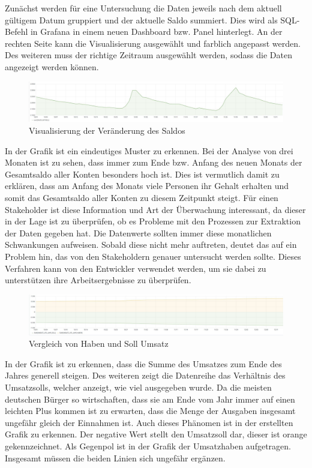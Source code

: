 Zunächst werden für eine Untersuchung die Daten jeweils nach dem aktuell gültigem Datum gruppiert und der aktuelle Saldo summiert.
Dies wird als SQL-Befehl in Grafana in einem neuen Dashboard bzw. Panel hinterlegt.
An der rechten Seite kann die Visualisierung ausgewählt und farblich angepasst werden.
Des weiteren muss der richtige Zeitraum ausgewählt werden, sodass die Daten angezeigt werden können.

\begin{figure}[h]
\centering
\includegraphics[width=150mm,scale=1]{content/Saldo_aktuell.jpg}
\caption{Visualisierung der Veränderung des Saldos}%
\end{figure}


In der Grafik ist ein eindeutiges Muster zu erkennen. 
Bei der Analyse von drei Monaten ist zu sehen, dass immer zum Ende bzw. Anfang des neuen Monats der Gesamtsaldo aller Konten besonders hoch ist. 
Dies ist vermutlich damit zu erklären, dass am Anfang des Monats viele Personen ihr Gehalt erhalten und somit das Gesamtsaldo aller Konten zu diesem Zeitpunkt steigt. 
Für einen Stakeholder ist diese Information und Art der Überwachung interessant, da dieser in der Lage ist zu überprüfen, ob es Probleme mit den Prozessen zur Extraktion der Daten gegeben hat. 
Die Datenwerte sollten immer diese monatlichen Schwankungen aufweisen.
Sobald diese nicht mehr auftreten, deutet das auf ein Problem hin, das von den Stakeholdern genauer untersucht werden sollte. 
Dieses Verfahren kann von den Entwickler verwendet werden, um sie dabei zu unterstützen ihre Arbeitsergebnisse zu überprüfen.



\begin{figure}[h]
\centering
\includegraphics[width=150mm,scale=1]{content/vergleich_haben_soll.jpg}
\caption{Vergleich von Haben und Soll Umsatz}%
\end{figure}

In der Grafik ist zu erkennen, dass die Summe des Umsatzes zum Ende des Jahres generell steigen. 
Des weiteren zeigt die Datenreihe das Verhältnis des Umsatzsolls, welcher anzeigt, wie viel ausgegeben wurde. 
Da die meisten deutschen Bürger so wirtschaften, dass sie am Ende vom Jahr immer auf einen leichten Plus kommen ist zu erwarten, dass die Menge der Ausgaben insgesamt ungefähr gleich der Einnahmen ist. \cite{https://www.welt.de/wirtschaft/article189283761/Sparverhalten-der-Deutschen-Fast-jeder-Dritte-hat-am-Monatsende-kein-Geld-mehr.html}
Auch dieses Phänomen ist in der erstellten Grafik zu erkennen. 
Der negative Wert stellt den Umsatzsoll dar, dieser ist orange gekennzeichnet. 
Als Gegenpol ist in der Grafik der Umsatzhaben aufgetragen. 
Insgesamt müssen die beiden Linien sich ungefähr ergänzen. 


